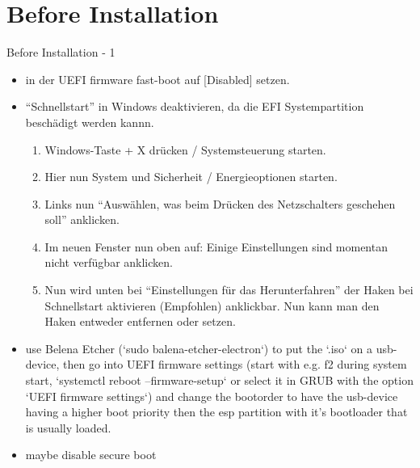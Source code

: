 
\section{Before Installation}

\begin{frame}[allowframebreaks]{Before Installation - 1}
  \begin{itemize}
    \item in der UEFI firmware fast-boot auf [Disabled] setzen.
    \item \enquote{Schnellstart} in Windows deaktivieren, da die EFI Systempartition beschädigt werden kannn.
      \begin{enumerate}
        \item Windows-Taste + X drücken / Systemsteuerung starten.
        \item Hier nun System und Sicherheit / Energieoptionen starten.
        \item Links nun \enquote{Auswählen, was beim Drücken des Netzschalters geschehen soll} anklicken.
        \item Im neuen Fenster nun oben auf: Einige Einstellungen sind momentan nicht verfügbar anklicken.
        \item Nun wird unten bei \enquote{Einstellungen für das Herunterfahren} der Haken bei Schnellstart aktivieren (Empfohlen) anklickbar. Nun kann man den Haken entweder entfernen oder setzen.
      \end{enumerate}
    \item use Belena Etcher (`sudo balena-etcher-electron`) to put the `.iso` on a usb-device, then go into UEFI firmware settings (start with e.g. f2 during system start, `systemctl reboot --firmware-setup` or select it in GRUB with the option `UEFI firmware settings`) and change the bootorder to have the usb-device having a higher boot priority then the esp partition with it's bootloader that is usually loaded.
    \item maybe disable secure boot
  \end{itemize}
\end{frame}
